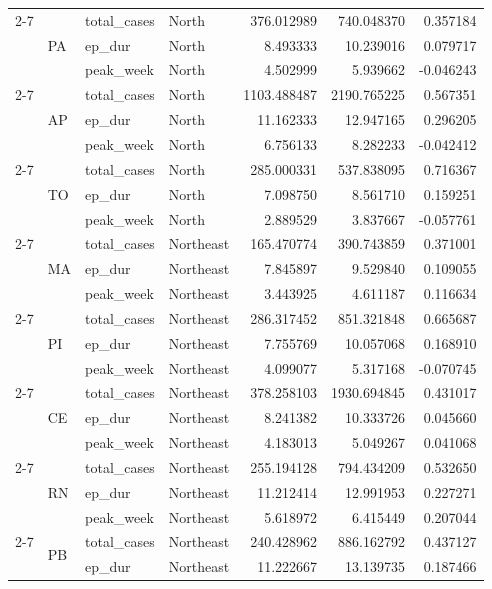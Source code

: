 \documentclass{report}
\begin{document}
\begin{center}
\begin{center}
\begin{longtable}{llllrrr}
\cline{2-7}
 & \multirow[t]{3}{*}{PA} & total\_cases & North & 376.012989 & 740.048370 & 0.357184 \\
 &  & ep\_dur & North & 8.493333 & 10.239016 & 0.079717 \\
 &  & peak\_week & North & 4.502999 & 5.939662 & -0.046243 \\
\cline{2-7}
 & \multirow[t]{3}{*}{AP} & total\_cases & North & 1103.488487 & 2190.765225 & 0.567351 \\
 &  & ep\_dur & North & 11.162333 & 12.947165 & 0.296205 \\
 &  & peak\_week & North & 6.756133 & 8.282233 & -0.042412 \\
\cline{2-7}
 & \multirow[t]{3}{*}{TO} & total\_cases & North & 285.000331 & 537.838095 & 0.716367 \\
 &  & ep\_dur & North & 7.098750 & 8.561710 & 0.159251 \\
 &  & peak\_week & North & 2.889529 & 3.837667 & -0.057761 \\
\cline{2-7}
 & \multirow[t]{3}{*}{MA} & total\_cases & Northeast & 165.470774 & 390.743859 & 0.371001 \\
 &  & ep\_dur & Northeast & 7.845897 & 9.529840 & 0.109055 \\
 &  & peak\_week & Northeast & 3.443925 & 4.611187 & 0.116634 \\
\cline{2-7}
 & \multirow[t]{3}{*}{PI} & total\_cases & Northeast & 286.317452 & 851.321848 & 0.665687 \\
 &  & ep\_dur & Northeast & 7.755769 & 10.057068 & 0.168910 \\
 &  & peak\_week & Northeast & 4.099077 & 5.317168 & -0.070745 \\
\cline{2-7}
 & \multirow[t]{3}{*}{CE} & total\_cases & Northeast & 378.258103 & 1930.694845 & 0.431017 \\
 &  & ep\_dur & Northeast & 8.241382 & 10.333726 & 0.045660 \\
 &  & peak\_week & Northeast & 4.183013 & 5.049267 & 0.041068 \\
\cline{2-7}
 & \multirow[t]{3}{*}{RN} & total\_cases & Northeast & 255.194128 & 794.434209 & 0.532650 \\
 &  & ep\_dur & Northeast & 11.212414 & 12.991953 & 0.227271 \\
 &  & peak\_week & Northeast & 5.618972 & 6.415449 & 0.207044 \\
\cline{2-7}
 & \multirow[t]{3}{*}{PB} & total\_cases & Northeast & 240.428962 & 886.162792 & 0.437127 \\
 &  & ep\_dur & Northeast & 11.222667 & 13.139735 & 0.187466 \\

\end{longtable}
\end{center}
\end{center}
\end{document}
